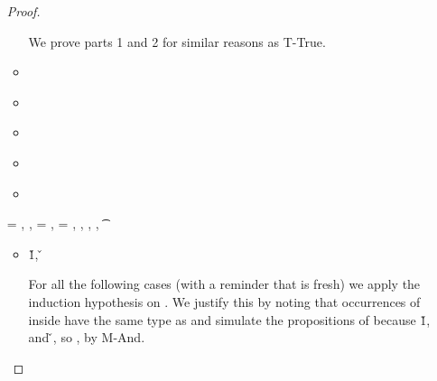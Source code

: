\begin{lemma}
\begin{enumerate}
\begin{proof}
\begin{case}[T-AssocHMap]
\begin{itemize}
\begin{subcase}[B-Assoc]
        We prove parts 1 and 2 for similar reasons as T-True.
      \end{subcase}
    \item[]
      \begin{subcase}[BE-Assoc1]
      \end{subcase}
    \item[]
      \begin{subcase}[BE-Assoc2]
      \end{subcase}
    \item[]
      \begin{subcase}[BE-Assoc3]
      \end{subcase}
  \end{itemize}
\end{case}

\begin{case}[T-If]

  \begin{itemize}
    \item[]
      \begin{subcase}[B-If]
      \end{subcase}
    \item[]
      \begin{subcase}[BE-If]
      \end{subcase}
  \end{itemize}
\end{case}

\begin{case}[T-Let]
  \e{} = { {} {}},
  \judgement {\propenv{}} { {\s{}}} { {}}
             {},
             \propp{} = {\impprop {\notprop {\falsy{}} {\x{}}} {}},
             \proppp{} = {\impprop {\isprop {\falsy{}} {\x{}}} {}},
  \judgement
       {\propenv{}, {\isprop {\s{}} {\x{}}},
         {\propp{}},
         {\proppp{}}}
             { {\t{}}} {\filterset {\thenprop {\prop{}}} {\elseprop {\prop{}}}}
             {\object{}} 


  \begin{itemize}
    \item[]
      \begin{subcase}[B-Let]
        \opsem {\openv{}} {} {\v{1}},
         {} {\v{}}

        For all the following cases (with a reminder that \x{} is fresh)
        we apply the induction hypothesis on . We justify this by noting
        that occurrences of \x{} inside  have the same type as  and 
        simulate the propositions of 
        because 
        \opsem {\openv{}} {} {\v{1}},
        and
         {} {\v{}},
        so \satisfies{\openv{}}{\propenv{}, {\isprop {\s{}} {\x{}}}, \propp{}, \proppp{}},
        by M-And.


\end{subcase}
\end{itemize}
\end{case}
\end{proof}
\end{enumerate}
\end{lemma}
